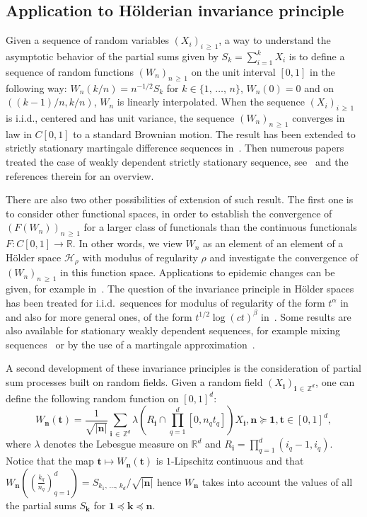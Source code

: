 \documentclass[10pt]{amsart}
\theoremstyle{definition}\newtheorem{defi}[theo]{Definition}\newtheorem{rema}[theo]{Remark}\newtheorem{exam}[theo]{Example}\newtheorem{exem}[theo]{Example}\newtheorem{nota}[theo]{Notation}
\newcommand{\clH}{\mathcal{H}}
\newcommand\R{\mathbb{R}}
\newcommand\Z{\mathbb{Z}}
\newcommand\ens[1]{\{ #1\}}
\newcommand\abs[1]{|#1|}
\newcommand{\pr}[1]{(#1)}
\newcommand{\gr}[1]{\bm{#1}}
\newcommand{\gri}{\bm{i}}
\newcommand{\grn}{\bm{n}}
\newcommand{\grk}{\bm{k}}
\newcommand{\grt}{\bm{t}}
\newcommand{\imd}{\preccurlyeq}
\newcommand{\smd}{\succcurlyeq }
\begin{document}
\subsection{Application to H\"olderian invariance principle}\label{subsc:HWIP}
Given a sequence of random variables $\pr{X_i}_{i\,\geq\,1}$, a way to understand the asymptotic behavior of the partial sums given by $S_k=\sum_{i=1}^kX_i$ is to define a sequence of random functions $\pr{W_n}_{n\,\geq\,1}$ on the unit interval $[0,1]$ in the following way: $W_n\pr{k/n} =n^{-1/2}S_k$ for $k\in\ens{1,\,\dots,\,n}$, $W_n\pr{0}=0$ and on $\pr{\pr{k-1}/n,k/n}$, $W_n$ is linearly interpolated. When the sequence $\pr{X_i}_{i\,\geq\,1}$ is i.i.d., centered and has unit variance, the sequence $\pr{W_n}_{n\,\geq\,1}$ converges in law in $C[0,1]$ to a standard Brownian motion. The result has been extended to strictly stationary martingale difference sequences in~\cite{MR0126871,MR0151997}. Then numerous papers treated the case of weakly dependent strictly stationary sequence, see~\cite{MR2206313} and the references therein for an overview.

There are also two other possibilities of extension of such result. The first one is to consider other functional spaces, in order to establish the convergence of $\pr{F\pr{W_n}}_{n\,\geq\,1}$ for a larger class of functionals than the continuous functionals $F\colon C[0,1]\to\R$. In other words, we view $W_n$ as an element of an element of a H\"older space $\clH_\rho$ with modulus of regularity $\rho$ and investigate the convergence of $\pr{W_n}_{n\,\geq\,1}$ in this function space. Applications to epidemic changes can be given, for example in~\cite{MR2265057}. The question of the invariance principle in H\"older spaces has been treated for i.i.d.\ sequences for modulus of regularity of the form $t^\alpha$ in~\cite{MR2000642} and also for more general ones, of the form $t^{1/2}\log
\pr{ct}^\beta$ in~\cite{MR2054586}. Some results are also available for stationary weakly dependent sequences, for example mixing sequences~\cite{MR3615086,MR1759810} or by the use of a martingale approximation~\cite{MR3426520,MR3770868}.

A second development of these invariance principles is the consideration of partial sum processes built on random fields. Given a random field $\pr{X_{\gri}}_{\gri\,\in\,\Z^d}$, one can define the following random function on $[0,1]^d$:
\begin{equation}
W_{\grn}\left(\grt\right)=\frac 1{\sqrt{\left|\grn\right|}}
\sum_{\gri\,\in\,\Z^d}
\lambda\left(R_{\gri}\cap \prod_{q=1}^d \left[0,n_qt_q\right]\right) X_{\gri}, \grn\smd\gr{1}, \grt \in [0,1]^d,
\end{equation}
where $\lambda$ denotes the Lebesgue measure on $\R^d$ and $R_{\gri}=\prod_{q=1}^d\pr{ i_q-1,i_q}$. Notice that the map $\grt\mapsto W_{\grn}\pr{\grt}$ is $1$-Lipschitz continuous and that $W_{\grn}\pr{\pr{\frac{k_q}{n_q}}_{q=1}^d}=S_{k_1,\,\dots,\,k_d}/\sqrt{\abs{\grn}}$ hence $W_{\grn}$ takes into account the values of all the partial sums $S_{\grk}$ for $\gr{1}\imd\gr{k}\imd\grn$.
\end{document}
